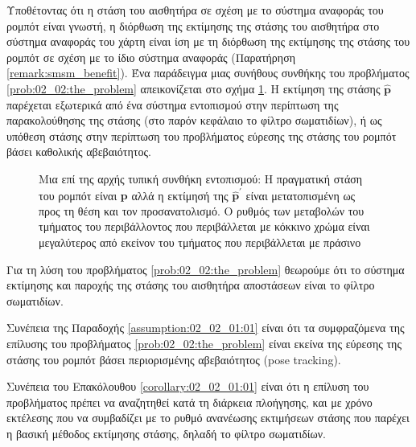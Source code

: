 Υποθέτοντας ότι η στάση του αισθητήρα σε σχέση με το σύστημα αναφοράς του
ρομπότ είναι γνωστή, η διόρθωση της εκτίμησης της στάσης του αισθητήρα στο
σύστημα αναφοράς του χάρτη είναι ίση με τη διόρθωση της εκτίμησης της στάσης
του ρομπότ σε σχέση με το ίδιο σύστημα αναφοράς (Παρατήρηση
\ref{remark:smsm_benefit}). Ένα παράδειγμα μιας συνήθους συνθήκης του
προβλήματος \ref{prob:02_02:the_problem} απεικονίζεται στο σχήμα
\ref{fig:02_02:the_problem}. Η εκτίμηση της στάσης $\hat{\bm{p}}$ παρέχεται
εξωτερικά από ένα σύστημα εντοπισμού στην περίπτωση της παρακολούθησης της
στάσης (στο παρόν κεφάλαιο το φίλτρο σωματιδίων), ή ως υπόθεση στάσης στην
περίπτωση του προβλήματος εύρεσης της στάσης του ρομπότ βάσει καθολικής
αβεβαιότητος.

\begin{figure}[]\centering
  
  \caption{\small Μια επί της αρχής τυπική συνθήκη εντοπισμού: Η πραγματική
           στάση του ρομπότ είναι $\bm{p}$ αλλά η εκτίμησή της
           $\hat{\bm{p}}^\prime$ είναι μετατοπισμένη ως προς τη θέση και τον
           προσανατολισμό. Ο ρυθμός των μεταβολών του τμήματος του
           περιβάλλοντος που περιβάλλεται με κόκκινο χρώμα είναι μεγαλύτερος
           από εκείνον του τμήματος που περιβάλλεται με πράσινο}
  \label{fig:02_02:the_problem}
\end{figure}


\begin{bw_box}
  \begin{assumption}
    \label{assumption:02_02_01:01}
    Για τη λύση του προβλήματος \ref{prob:02_02:the_problem} θεωρούμε ότι το
    σύστημα εκτίμησης και παροχής της στάσης του αισθητήρα αποστάσεων είναι το
    φίλτρο σωματιδίων.
  \end{assumption}
\end{bw_box}

\begin{bw_box}
  \begin{corollary}
    \label{corollary:02_02_01:01}
    Συνέπεια της Παραδοχής \ref{assumption:02_02_01:01} είναι ότι τα
    συμφραζόμενα της επίλυσης του προβλήματος \ref{prob:02_02:the_problem}
    είναι εκείνα της εύρεσης της στάσης του ρομπότ βάσει περιορισμένης
    αβεβαιότητος (pose tracking).
  \end{corollary}
\end{bw_box}

\begin{bw_box}
  \begin{corollary}
    \label{corollary:02_02_01:02}
    Συνέπεια του Επακόλουθου \ref{corollary:02_02_01:01} είναι ότι η επίλυση
    του προβλήματος πρέπει να αναζητηθεί κατά τη διάρκεια πλοήγησης, και με
    χρόνο εκτέλεσης που να συμβαδίζει με το ρυθμό ανανέωσης εκτιμήσεων στάσης
    που παρέχει η βασική μέθοδος εκτίμησης στάσης, δηλαδή το φίλτρο σωματιδίων.
  \end{corollary}
\end{bw_box}

